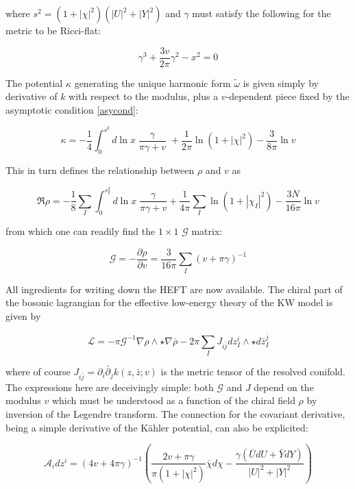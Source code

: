 where $s^2 = (1+|\chi|^2)(|U|^2 + |Y|^2)$ and $\gamma$ must satisfy the following for the metric to be Ricci-flat:

\begin{equation}
	\gamma^3 + \frac{3v}{2\pi} \gamma^2 - x^2 = 0
	\label{}
\end{equation}

The potential $\kappa$ generating the unique harmonic form $\tilde\omega$ is given simply by derivative of $k$ with respect to the modulus, plus a $v$-dependent piece fixed by the asymptotic condition \eqref{asycond}:

\begin{equation}
	\kappa = -\frac{1}{4} \int_0^{s^2} d\ln x \; \frac{\gamma}{\pi\gamma+v} \; + \frac{1}{2\pi} \ln(1+ |\chi|^2) - \frac{3}{8\pi}\ln v
	\label{}
\end{equation}

This in turn defines the relationship between $\rho$ and $v$ as

\begin{equation}
	\Re \rho = - \frac{1}{8} \sum_I \int_0^{s_I^2} d\ln x \; \frac{\gamma}{\pi\gamma + v} + \frac{1}{4\pi}\sum_I \ln(1+|\chi_I|^2) - \frac{3N}{16\pi} \ln v
\end{equation}

from which one can readily find the $1\times1$ $\mathcal{G}$ matrix:

\begin{equation}
	\mathcal{G} = - \frac{\partial \rho}{\partial v} = \frac{3}{16\pi}\sum_I (v+\pi\gamma)^{-1}
	\label{}
\end{equation}

All ingredients for writing down the HEFT are now available. The chiral part of the bosonic lagrangian for the effective low-energy theory of the KW model is given by

\begin{equation}
	\mathcal{L} = - \pi \mathcal{G}^{-1} \nabla \rho \wedge \star \nabla \bar \rho - 2\pi \sum_I J_{i\bar j} dz_I^i \wedge \star d\bar z_I^{\bar j} 
	\label{}
\end{equation}

where of course $J_{i\bar j} = \partial_i \bar \partial_j k(z,\bar z; v)$ is the metric tensor of the resolved conifold. The expressions here are deceivingly simple: both $\mathcal{G}$ and $J$ depend on the modulus $v$ which must be understood as a function of the chiral field $\rho$ by inversion of the Legendre transform. The connection for the covariant derivative, being a simple derivative of the K\"ahler potential, can also be explicited:

\begin{equation}
	\mathcal{A}_i dz^i = (4v + 4\pi \gamma)^{-1} \left( \frac{2v + \pi\gamma}{\pi(1+|\chi|^2)}\bar\chi d\chi - \frac{\gamma\left( \bar U dU + \bar Y dY \right)}{|U|^2 + |Y|^2} \right)
	\label{}
\end{equation}
